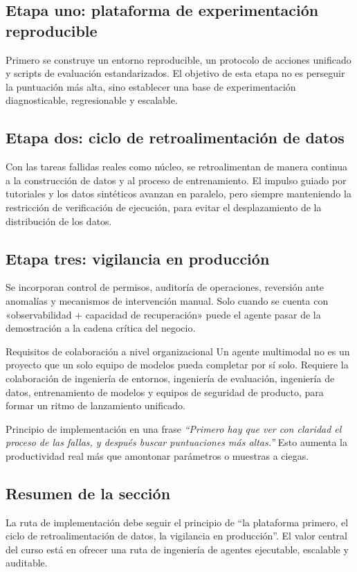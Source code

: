 \documentclass[a4paper]{article}
\begin{document}
\subsection{Etapa uno: plataforma de experimentación reproducible}
Primero se construye un entorno reproducible, un protocolo de acciones unificado y scripts de evaluación estandarizados. El objetivo de esta etapa no es perseguir la puntuación más alta, sino establecer una base de experimentación diagnosticable, regresionable y escalable.

\subsection{Etapa dos: ciclo de retroalimentación de datos}
Con las tareas fallidas reales como núcleo, se retroalimentan de manera continua a la construcción de datos y al proceso de entrenamiento. El impulso guiado por tutoriales y los datos sintéticos avanzan en paralelo, pero siempre manteniendo la restricción de verificación de ejecución, para evitar el desplazamiento de la distribución de los datos.

\subsection{Etapa tres: vigilancia en producción}
Se incorporan control de permisos, auditoría de operaciones, reversión ante anomalías y mecanismos de intervención manual. Solo cuando se cuenta con «observabilidad + capacidad de recuperación» puede el agente pasar de la demostración a la cadena crítica del negocio.

\begin{knowledgebox}{Requisitos de colaboración a nivel organizacional}
Un agente multimodal no es un proyecto que un solo equipo de modelos pueda completar por sí solo. Requiere la colaboración de ingeniería de entornos, ingeniería de evaluación, ingeniería de datos, entrenamiento de modelos y equipos de seguridad de producto, para formar un ritmo de lanzamiento unificado.
\end{knowledgebox}

\begin{importantbox}{Principio de implementación en una frase}
\textit{``Primero hay que ver con claridad el proceso de las fallas, y después buscar puntuaciones más altas.''} Esto aumenta la productividad real más que amontonar parámetros o muestras a ciegas.
\end{importantbox}

\subsection{Resumen de la sección}
La ruta de implementación debe seguir el principio de ``la plataforma primero, el ciclo de retroalimentación de datos, la vigilancia en producción''. El valor central del curso está en ofrecer una ruta de ingeniería de agentes ejecutable, escalable y auditable.
\end{document}
